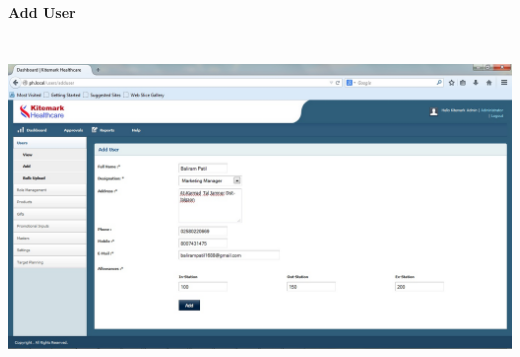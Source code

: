 \textbf{Add User}
\begin{center}
\includegraphics[height=9cm,width=14cm]{Admin/addusers.jpg}
\end{center}
\pagebreak

		
		
		
		
		
		
		
		
		
		
		
		
		
		
		
		
		
		
		
		
		
		
		
		
		
		
		
		
 		

